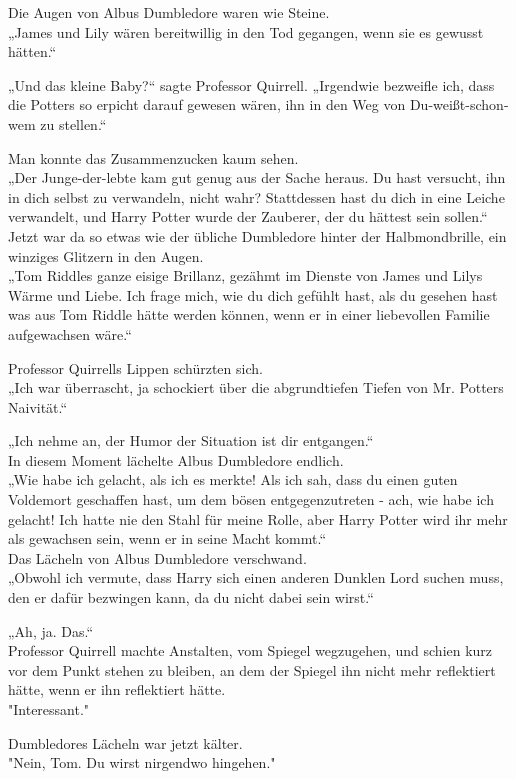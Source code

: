 {Die Augen von Albus Dumbledore waren wie Steine.\\ „James und Lily wären bereitwillig in den Tod gegangen, wenn sie es gewusst hätten.“

„Und das kleine Baby?“ sagte Professor Quirrell. „Irgendwie bezweifle ich, dass die Potters so erpicht darauf gewesen wären, ihn in den Weg von Du-weißt-schon-wem zu stellen.“

Man konnte das Zusammenzucken kaum sehen.\\ „Der Junge-der-lebte kam gut genug aus der Sache heraus. Du hast versucht, ihn in dich selbst zu verwandeln, nicht wahr? Stattdessen hast du dich in eine Leiche verwandelt, und Harry Potter wurde der Zauberer, der du hättest sein sollen.“\\ Jetzt war da so etwas wie der übliche Dumbledore hinter der Halbmondbrille, ein winziges Glitzern in den Augen.\\ „Tom Riddles ganze eisige Brillanz, gezähmt im Dienste von James und Lilys Wärme und Liebe. Ich frage mich, wie du dich gefühlt hast, als du gesehen hast was aus Tom Riddle hätte werden können, wenn er in einer liebevollen Familie aufgewachsen wäre.“

Professor Quirrells Lippen schürzten sich.\\ „Ich war überrascht, ja schockiert über die abgrundtiefen Tiefen von Mr. Potters Naivität.“

„Ich nehme an, der Humor der Situation ist dir entgangen.“\\ In diesem Moment lächelte Albus Dumbledore endlich.\\ „Wie habe ich gelacht, als ich es merkte! Als ich sah, dass du einen guten Voldemort geschaffen hast, um dem bösen entgegenzutreten - ach, wie habe ich gelacht! Ich hatte nie den Stahl für meine Rolle, aber Harry Potter wird ihr mehr als gewachsen sein, wenn er in seine Macht kommt.“\\ Das Lächeln von Albus Dumbledore verschwand.\\ „Obwohl ich vermute, dass Harry sich einen anderen Dunklen Lord suchen muss, den er dafür bezwingen kann, da du nicht dabei sein wirst.“

„Ah, ja. Das.“\\ Professor Quirrell machte Anstalten, vom Spiegel wegzugehen, und schien kurz vor dem Punkt stehen zu bleiben, an dem der Spiegel ihn nicht mehr reflektiert hätte, wenn er ihn reflektiert hätte.\\ "Interessant."

Dumbledores Lächeln war jetzt kälter.\\ "Nein, Tom. Du wirst nirgendwo hingehen."

}

